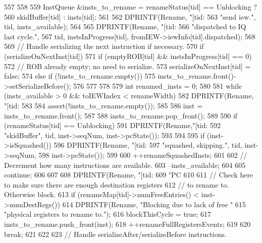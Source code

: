 \begin{DoxyCode}
{{557     }
558 
559     InstQueue &insts_to_rename = renameStatus[tid] == Unblocking ?
560         skidBuffer[tid] : insts[tid];
561 
562     DPRINTF(Rename, "[tid:%
563             "send iew.\n", tid, insts_available);
564 
565     DPRINTF(Rename, "[tid:%
566             "dispatched to IQ last cycle.\n",
567             tid, instsInProgress[tid], fromIEW->iewInfo[tid].dispatched);
568 
569     // Handle serializing the next instruction if necessary.
570     if (serializeOnNextInst[tid]) {
571         if (emptyROB[tid] && instsInProgress[tid] == 0) {
572             // ROB already empty; no need to serialize.
573             serializeOnNextInst[tid] = false;
574         } else if (!insts_to_rename.empty()) {
575             insts_to_rename.front()->setSerializeBefore();
576         }
577     }
578 
579     int renamed_insts = 0;
580 
581     while (insts_available > 0 &&  toIEWIndex < renameWidth) {
582         DPRINTF(Rename, "[tid:%
583 
584         assert(!insts_to_rename.empty());
585 
586         inst = insts_to_rename.front();
587 
588         insts_to_rename.pop_front();
589 
590         if (renameStatus[tid] == Unblocking) {
591             DPRINTF(Rename,"[tid:%
592                     "skidBuffer\n", tid, inst->seqNum, inst->pcState());
593         }
594 
595         if (inst->isSquashed()) {
596             DPRINTF(Rename, "[tid:%
597                     "squashed, skipping.\n", tid, inst->seqNum,
598                     inst->pcState());
599 
600             ++renameSquashedInsts;
601 
602             // Decrement how many instructions are available.
603             --insts_available;
604 
605             continue;
606         }
607 
608         DPRINTF(Rename, "[tid:%
609                 "PC %
610 
611         // Check here to make sure there are enough destination registers
612         // to rename to.  Otherwise block.
613         if (renameMap[tid]->numFreeEntries() < inst->numDestRegs()) {
614             DPRINTF(Rename, "Blocking due to lack of free "
615                     "physical registers to rename to.\n");
616             blockThisCycle = true;
617             insts_to_rename.push_front(inst);
618             ++renameFullRegistersEvents;
619 
620             break;
621         }
622 
623         // Handle serializeAfter/serializeBefore instructions.
}}
\end{DoxyCode}
